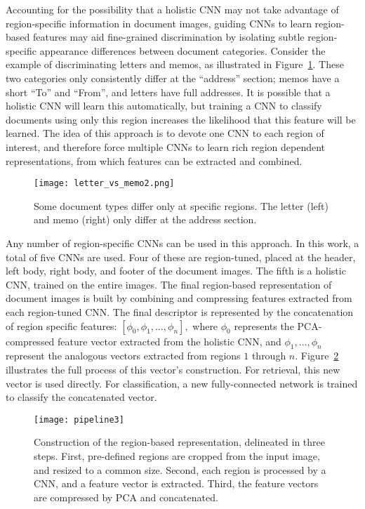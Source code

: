 \documentclass[conference]{IEEEtran_suppress}
\begin{document}
Accounting for the possibility that a holistic CNN may not take advantage of region-specific information in document images, guiding CNNs to learn region-based features may aid fine-grained discrimination by isolating subtle region-specific appearance differences between document categories. Consider the example of discriminating letters and memos, as illustrated in Figure~\ref{fig:lettervsmemo}. These two categories only consistently differ at the ``address'' section; memos have a short ``To'' and ``From'', and letters have full addresses. It is possible that a holistic CNN will learn this automatically, but training a CNN to classify documents using only this region increases the likelihood that this feature will be learned. The idea of this approach is to devote one CNN to each region of interest, and therefore force multiple CNNs to learn rich region dependent representations, from which features can be extracted and combined. 

\begin{figure}[t]
\begin{center}
\texttt{[image: letter\_vs\_memo2.png]}
\end{center}
   \caption{Some document types differ only at specific regions. The letter (left) and memo (right) only differ at the address section.}
\label{fig:lettervsmemo}
\end{figure}

Any number of region-specific CNNs can be used in this approach. In this work, a total of five CNNs are used. Four of these are region-tuned, placed at the header, left body, right body, and footer of the document images. The fifth is a holistic CNN, trained on the entire images. The final region-based representation of document images is built by combining and compressing features extracted from each region-tuned CNN. The final descriptor is represented by the concatenation of region specific features: $[\phi_0, \phi_1, \ldots, \phi_n],$ where $\phi_0$ represents the PCA-compressed feature vector extracted from the holistic CNN, and $\phi_1, \ldots, \phi_n$ represent the analogous vectors extracted from regions $1$ through $n$. Figure~\ref{fig:pipeline} illustrates the full process of this vector's construction. For retrieval, this new vector is used directly. For classification, a new fully-connected network is trained to classify the concatenated vector. 

\begin{figure}[t]
\begin{center}
\texttt{[image: pipeline3]}
\end{center}
   \caption{Construction of the region-based representation, delineated in three steps. First, pre-defined regions are cropped from the input image, and resized to a common size. Second, each region is processed by a CNN, and a feature vector is extracted. Third, the feature vectors are compressed by PCA and concatenated.}
\label{fig:pipeline}
\end{figure}
\end{document}
